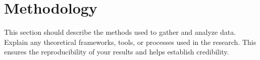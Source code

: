 \section{Methodology}
This section should describe the methods used to gather and analyze data. Explain any theoretical frameworks, tools, or processes used in the research. This ensures the reproducibility of your results and helps establish credibility.
